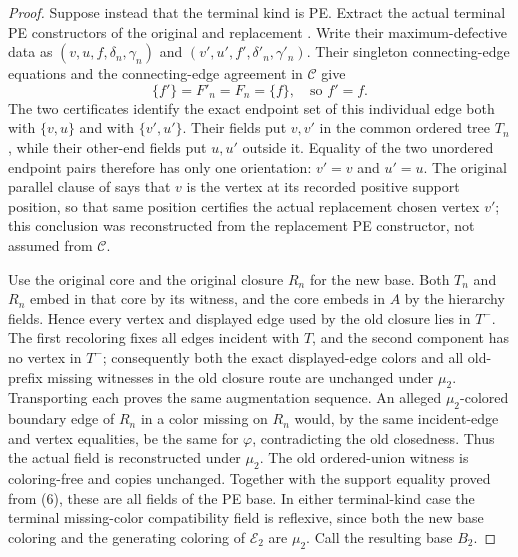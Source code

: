 \begin{proof}
Suppose instead that the terminal kind is PE.  Extract the actual terminal
PE constructors of the original and replacement
.  Write their maximum-defective data as
$(v,u,f,\delta_n,\gamma_n)$ and
$(v',u',f',\delta'_n,\gamma'_n)$.  Their singleton connecting-edge
equations and the connecting-edge agreement in $\mathcal C$ give
\[
                         \{f'\}=F'_n=F_n=\{f\},
 \quad\text{so }f'=f.                                       \tag{6}
\]
The two  certificates identify the exact
endpoint set of this individual edge both with $\{v,u\}$ and with
$\{v',u'\}$.  Their  fields put $v,v'$ in the
common ordered tree $T_n$, while their other-end fields put $u,u'$ outside
it.  Equality of the two unordered endpoint pairs therefore has only one
orientation: $v'=v$ and $u'=u$.  The original parallel clause of
 says that $v$ is the vertex at its recorded
positive support position, so that same position certifies the actual
replacement chosen vertex $v'$; this conclusion was reconstructed from
the replacement PE constructor, not assumed from $\mathcal C$.

Use the original core and the original closure $R_n$ for the new base.
Both $T_n$ and $R_n$ embed in that core by its
 witness, and the core embeds in $A$ by the
hierarchy fields.  Hence every vertex and displayed edge used by the old
closure lies in $T^-$.  The first recoloring fixes all edges incident with
$T$, and the second component has no vertex in $T^-$; consequently both
the exact displayed-edge colors and all old-prefix missing witnesses in
the old closure route are unchanged under $\mu_2$.  Transporting each
 proves the same augmentation sequence.
An alleged $\mu_2$-colored boundary edge of $R_n$ in a color missing on
$R_n$ would, by the same incident-edge and vertex equalities, be the same
for $\varphi$, contradicting the old closedness.  Thus the actual
 field is reconstructed under $\mu_2$.
The old ordered-union witness is coloring-free and copies unchanged.
Together with the support equality proved from (6), these are all fields
of the PE base.  In either terminal-kind case the terminal missing-color
compatibility field is reflexive, since both the new base coloring and
the generating coloring of $\mathcal E_2$ are $\mu_2$.  Call the resulting
base $B_2$.


\end{proof}
